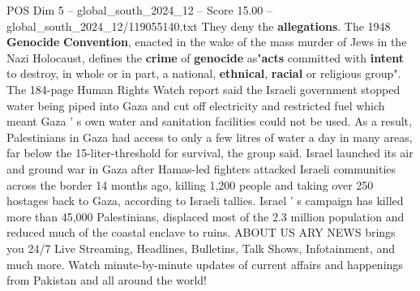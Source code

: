 \begin{textsample}{POS Dim 5 – global\_south\_2024\_12 – Score 15.00 – global\_south\_2024\_12/119055140.txt}
They deny the \textbf{allegations}.
The 1948 \textbf{Genocide} \textbf{Convention}, enacted in the wake of the mass murder of Jews in the Nazi Holocaust, defines the \textbf{crime} of \textbf{genocide} as"\textbf{acts} committed with \textbf{intent} to destroy, in whole or in part, a national, \textbf{ethnical}, \textbf{racial} or religious group".
The 184-page Human Rights Watch report said the Israeli government stopped water being piped into Gaza and cut off electricity and restricted fuel which meant Gaza ' s own water and sanitation facilities could not be used.
As a result, Palestinians in Gaza had access to only a few litres of water a day in many areas, far below the 15-liter-threshold for survival, the group said.
Israel launched its air and ground war in Gaza after Hamas-led fighters attacked Israeli communities across the border 14 months ago, killing 1,200 people and taking over 250 hostages back to Gaza, according to Israeli tallies.
Israel ' s campaign has killed more than 45,000 Palestinians, displaced most of the 2.3 million population and reduced much of the coastal enclave to ruins.
ABOUT US ARY NEWS brings you 24/7 Live Streaming, Headlines, Bulletins, Talk Shows, Infotainment, and much more.
Watch minute-by-minute updates of current affairs and happenings from Pakistan and all around the world!

\end{textsample}
